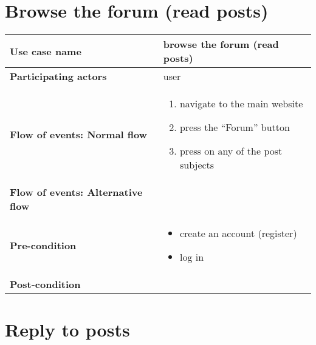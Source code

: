 \documentclass[a4paper, 13pt, draft]{report}
\begin{document}
\section*{Browse the forum (read posts)}

\begin{center}
    \begin{tabular}{| >{\bf}l | p{5.55cm} |} 
	\hline
	Use case name & browse the forum (read posts) \\ 
	\hline
	Participating actors & user \\
	\hline
	Flow of events: Normal flow & 
	\begin{enumerate}		
	    \item navigate to the main website
	    \item press the ``Forum'' button
	    \item press on any of the post subjects
	\end{enumerate}	\\
	\hline
	Flow of events: Alternative flow & \notapplicable \\
	\hline
	Pre-condition & 
	\begin{itemize} 
	    \item create an account (register)
	    \item log in
	\end{itemize} \\
	\hline
	Post-condition & \notapplicable \\
	\hline
    \end{tabular}
\end{center}

\section*{Reply to posts}
\end{document}
